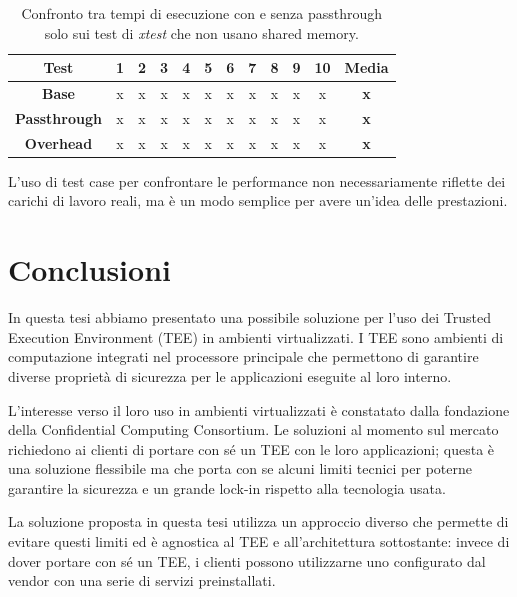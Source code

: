 \documentclass[12pt,italian]{report}
\begin{document}
\begin{table}
    \centering
    \begin{tabular}{|c|c|c|c|c|c|c|c|c|c|c|c|}
        \hline
        \textbf{Test} & 1 & 2 & 3 & 4 & 5 & 6 & 7 & 8 & 9 & 10 & \textbf{Media} \\
        \hline
        \textbf{Base} & x & x & x & x & x & x & x & x & x & x  & \textbf{x} \\
        \hline
        \textbf{Passthrough} & x & x & x & x & x & x & x & x & x & x & \textbf{x} \\
        \hline
        \textbf{Overhead} & x & x & x & x & x & x & x & x & x & x & \textbf{x} \\
        \hline
    \end{tabular}
    \label{tab:performance-no-shmem}
    \caption{
       Confronto tra tempi di esecuzione con e senza passthrough solo
       sui test di \textit{xtest} che non usano shared memory.
    }
\end{table}

L'uso di test case per confrontare le performance non necessariamente
riflette dei carichi di lavoro reali, ma è un modo semplice per avere
un'idea delle prestazioni.

\chapter{Conclusioni}
\label{chap:conclusioni}
In questa tesi abbiamo presentato una possibile soluzione per l'uso dei
Trusted Execution Environment (TEE) in ambienti virtualizzati.
I TEE sono ambienti di computazione integrati nel processore principale
che permettono di garantire diverse proprietà di sicurezza per le
applicazioni eseguite al loro interno.

L'interesse verso il loro uso in ambienti virtualizzati è constatato dalla
fondazione della Confidential Computing Consortium.
Le soluzioni al momento sul mercato richiedono ai clienti di portare con sé
un TEE con le loro applicazioni; questa è una soluzione flessibile ma che
porta con se alcuni limiti tecnici per poterne garantire la sicurezza
e un grande lock-in rispetto alla tecnologia usata.

La soluzione proposta in questa tesi utilizza un approccio diverso che
permette di evitare questi limiti ed è agnostica al TEE e all'architettura
sottostante:
invece di dover portare con sé un TEE, i clienti possono utilizzarne uno
configurato dal vendor con una serie di servizi preinstallati.
\end{document}
